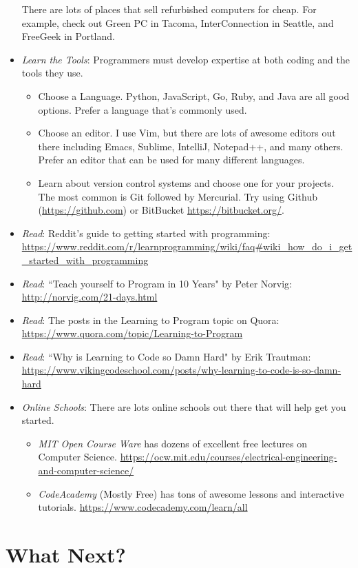 \documentclass{article}
\begin{document}
\begin{itemize}
There are lots of places that sell refurbished computers for cheap. For
example, check out Green PC in Tacoma, InterConnection in Seattle, and FreeGeek
in Portland.
\item \textit{Learn the Tools}: Programmers must develop expertise at both coding and the tools they use.
  \begin{itemize}
  \item Choose a Language. Python, JavaScript, Go, Ruby, and Java are all good
  options. Prefer a language that's commonly used.
  \item Choose an editor. I use Vim, but there are lots of awesome editors out
  there including Emacs, Sublime, IntelliJ, Notepad++, and many others. Prefer
  an editor that can be used for many different languages.
  \item Learn about version control systems and choose one for your projects.
  The most common is Git followed by Mercurial. Try using Github
  (\url{https://github.com}) or BitBucket \url{https://bitbucket.org/}.
  \end{itemize}
\item \textit{Read}: Reddit's guide to getting started with programming: \url{https://www.reddit.com/r/learnprogramming/wiki/faq#wiki_how_do_i_get_started_with_programming}
\item \textit{Read}: ``Teach yourself to Program in 10 Years" by Peter Norvig: \url{http://norvig.com/21-days.html}
\item \textit{Read}: The posts in the Learning to Program topic on Quora: \url{https://www.quora.com/topic/Learning-to-Program}
\item \textit{Read}: ``Why is Learning to Code so Damn Hard" by Erik Trautman: \url{https://www.vikingcodeschool.com/posts/why-learning-to-code-is-so-damn-hard}
\item \textit{Online Schools}: There are lots online schools out there that will help get you started.
  \begin{itemize}
  \item \textit{MIT Open Course Ware} has dozens of excellent free lectures on Computer Science. \url{https://ocw.mit.edu/courses/electrical-engineering-and-computer-science/}
  \item \textit{CodeAcademy} (Mostly Free) has tons of awesome lessons and interactive tutorials. \url{https://www.codecademy.com/learn/all}
  \end{itemize}
\end{itemize}

\section*{What Next?}
\end{document}
